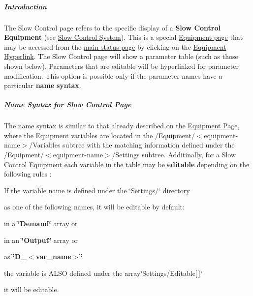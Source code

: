 \par
 \hypertarget{RC_mhttpd_sc_page_RC_mhttpd_slow_control_intro}{}\subparagraph{Introduction}\label{RC_mhttpd_sc_page_RC_mhttpd_slow_control_intro}
The Slow Control page refers to the specific display of a {\bfseries Slow Control Equipment} (see \hyperlink{FE_Slow_Control_system}{Slow Control System}). This is a special \hyperlink{RC_mhttpd_Equipment_page}{Equipment page} that may be accessed from the \hyperlink{RC_mhttpd_Main_Status_page_RC_mhttpd_main_status}{main status page} by clicking on the \hyperlink{RC_mhttpd_Equipment_page_RC_mhttpd_Equipment_Hyperlink}{Equipment Hyperlink}. The Slow Control page will show a parameter table (such as those shown below). Parameters that are editable will be hyperlinked for parameter modification. This option is possible only if the parameter names have a particular {\bfseries name} {\bfseries syntax}.\hypertarget{RC_mhttpd_sc_page_RC_mhttpd_slow_control_name_syntax}{}\subparagraph{Name Syntax for Slow Control Page}\label{RC_mhttpd_sc_page_RC_mhttpd_slow_control_name_syntax}
The name syntax is similar to that already described on the \hyperlink{RC_mhttpd_Equipment_page}{Equipment Page}, where the Equipment variables are located in the /Equipment/$<$equipment-\/name$>$/Variables subtree with the matching information defined under the /Equipment/$<$equipment-\/name$>$/Settings subtree. Additinally, for a Slow Control Equipment each variable in the table may be {\bfseries editable} depending on the following rules :


\begin{DoxyItemize}
\item If the variable name is defined under the \char`\"{}Settings/\char`\"{} directory
\begin{DoxyEnumerate}
\item as one of the following names, it will be editable by default:
\begin{DoxyItemize}
\item in a {\bfseries \char`\"{}Demand\char`\"{}} array or
\item in an {\bfseries \char`\"{}Output\char`\"{}} array or
\item as {\bfseries \char`\"{}D\_\-$<$var\_\-name$>$\char`\"{}} 
\end{DoxyItemize}
\end{DoxyEnumerate}
\end{DoxyItemize}


\begin{DoxyEnumerate}
\item the variable is ALSO defined under the array\char`\"{}Settings/Editable\mbox{[}$\,$\mbox{]}\char`\"{}
\begin{DoxyItemize}
\item it will be editable.
\end{DoxyItemize}
\end{DoxyEnumerate}

